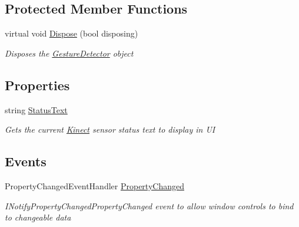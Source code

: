 \subsection*{Protected Member Functions}
\begin{DoxyCompactItemize}
\item 
virtual void \hyperlink{class_microsoft_1_1_samples_1_1_kinect_1_1_kinect_security_system_1_1_main_window_a39200cb7da268b1502bca94a7d9146a0}{Dispose} (bool disposing)
\begin{DoxyCompactList}\small\item\em Disposes the \hyperlink{class_microsoft_1_1_samples_1_1_kinect_1_1_kinect_security_system_1_1_gesture_detector}{Gesture\+Detector} object \end{DoxyCompactList}\end{DoxyCompactItemize}
\subsection*{Properties}
\begin{DoxyCompactItemize}
\item 
string \hyperlink{class_microsoft_1_1_samples_1_1_kinect_1_1_kinect_security_system_1_1_main_window_a46bd6cf62b1d6706fb5fa49d24c42b1b}{Status\+Text}
\begin{DoxyCompactList}\small\item\em Gets the current \hyperlink{namespace_microsoft_1_1_samples_1_1_kinect}{Kinect} sensor status text to display in UI \end{DoxyCompactList}\end{DoxyCompactItemize}
\subsection*{Events}
\begin{DoxyCompactItemize}
\item 
Property\+Changed\+Event\+Handler \hyperlink{class_microsoft_1_1_samples_1_1_kinect_1_1_kinect_security_system_1_1_main_window_afcc73bf291a2e49345083cf63d79078e}{Property\+Changed}
\begin{DoxyCompactList}\small\item\em I\+Notify\+Property\+Changed\+Property\+Changed event to allow window controls to bind to changeable data \end{DoxyCompactList}\end{DoxyCompactItemize}


